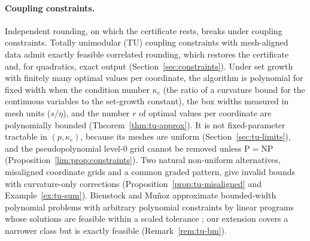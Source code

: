 \paragraph{Coupling constraints.}
Independent rounding, on which the certificate rests, breaks under coupling
constraints. Totally unimodular (TU) coupling constraints with mesh-aligned
data admit exactly feasible correlated rounding, which restores the certificate
and, for quadratics, exact output (Section~\ref{sec:constraints}). Under set
growth with finitely many optimal values per coordinate, the algorithm is
polynomial for fixed width when the condition number $\kappa_c$ (the ratio
of a curvature bound for the continuous variables to the set-growth
constant), the box widths measured in mesh units ($s/\eta$), and the number
$r$ of optimal values
per coordinate are polynomially bounded (Theorem~\ref{thm:tu-approx}). It is
not fixed-parameter tractable in $(p,\kappa_c)$, because its meshes are
uniform (Section~\ref{sec:tu-limits}), and the pseudopolynomial level-0 grid
cannot be removed unless P${}={}$NP (Proposition~\ref{lim:prop:constraints}).
Two natural non-uniform alternatives, misaligned coordinate grids and a
common graded pattern, give invalid bounds with curvature-only corrections
(Proposition~\ref{prop:tu-misaligned} and Example~\ref{ex:tu-sum}). Bienstock
and Mu\~noz approximate bounded-width polynomial problems with arbitrary
polynomial constraints by linear programs whose solutions are feasible within
a scaled tolerance \cite{BienstockMunoz2018}; our extension covers a narrower
class but is exactly feasible (Remark~\ref{rem:tu-bm}).

